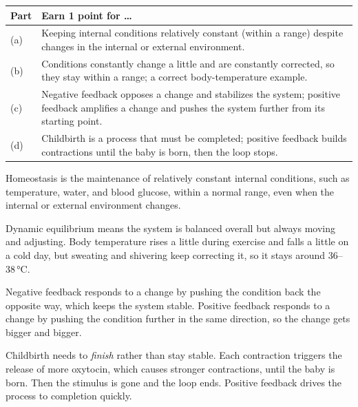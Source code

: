 \documentclass[11pt,letterpaper]{article}
\begin{document}

\begin{center}
\begin{tabularx}{\linewidth}{@{}lY@{}}
\toprule
Part & Earn 1 point for \dots{} \\
\midrule
(a) & Keeping internal conditions relatively constant (within a range) despite changes in the internal or external environment. \\
(b) & Conditions constantly change a little and are constantly corrected, so they stay within a range; a correct body-temperature example. \\
(c) & Negative feedback opposes a change and stabilizes the system; positive feedback amplifies a change and pushes the system further from its starting point. \\
(d) & Childbirth is a process that must be completed; positive feedback builds contractions until the baby is born, then the loop stops. \\
\bottomrule
\end{tabularx}
\end{center}

\modelanswer
\begin{parts}
  \item Homeostasis is the maintenance of relatively constant internal conditions, such as temperature, water, and blood glucose, within a normal range, even when the internal or external environment changes.
  \item Dynamic equilibrium means the system is balanced overall but always moving and adjusting. Body temperature rises a little during exercise and falls a little on a cold day, but sweating and shivering keep correcting it, so it stays around 36–38\,°C.
  \item Negative feedback responds to a change by pushing the condition back the opposite way, which keeps the system stable. Positive feedback responds to a change by pushing the condition further in the same direction, so the change gets bigger and bigger.
  \item Childbirth needs to \emph{finish} rather than stay stable. Each contraction triggers the release of more oxytocin, which causes stronger contractions, until the baby is born. Then the stimulus is gone and the loop ends. Positive feedback drives the process to completion quickly.
\end{parts}
\end{document}
